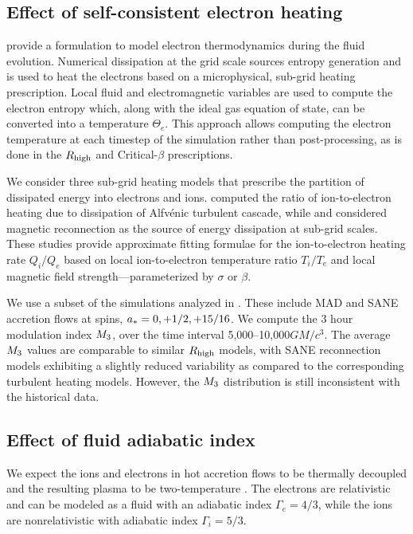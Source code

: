 \subsection{Effect of self-consistent electron heating}

\citealt{10.1093/mnras/stv2084} provide a formulation to model electron thermodynamics during the fluid evolution.
Numerical dissipation at the grid scale sources entropy generation and is used to heat the electrons based on a microphysical, sub-grid heating prescription.
Local fluid and electromagnetic variables are used to compute the electron entropy which, along with the ideal gas equation of state, can be converted into a temperature $\Theta_{e}$.
This approach allows computing the electron temperature at each timestep of the simulation rather than post-processing, as is done in the $R_\mathrm{high}$ and Critical-$\beta$ prescriptions.

We consider three sub-grid heating models that prescribe the partition of dissipated energy into electrons and ions.
\cite{2010MNRAS.409L.104H} computed the ratio of ion-to-electron heating due to dissipation of Alfv\'enic turbulent cascade, while \cite{10.1093/mnras/stx2530} and \cite{Rowan_2017} considered magnetic reconnection as the source of energy dissipation at sub-grid scales.
These studies provide approximate fitting formulae for the ion-to-electron heating rate $Q_{i}/Q_{e}$ based on local ion-to-electron temperature ratio $T_{i}/T_{e}$ and local magnetic field strength---parameterized by $\sigma$ or $\beta$.

We use a subset of the simulations analyzed in \citealt{2020MNRAS.494.4168D}.
These include MAD and SANE accretion flows at spins, $a_* = 0,+1/2,+15/16$.
We compute the 3 hour modulation index $M_{3}$, over the time interval 5,000--10,000$GM/c^{3}$.
The average $M_{3}$ values are comparable to similar $R_\mathrm{high}$ models, with SANE reconnection models exhibiting a slightly reduced variability as compared to the corresponding turbulent heating models.
However, the $M_{3}$ distribution is still inconsistent with the historical data.

\subsection{Effect of fluid adiabatic index}

We expect the ions and electrons in hot accretion flows to be thermally decoupled and the resulting plasma to be two-temperature \citep{1976ApJ...204..187S, Quataert_1998, 10.1093/mnras/stw3116, Ryan_2018, Chael2018}.
The electrons are relativistic and can be modeled as a fluid with an adiabatic index $\Gamma_{e}=4/3$, while the ions are nonrelativistic with adiabatic index $\Gamma_{i}=5/3$.

